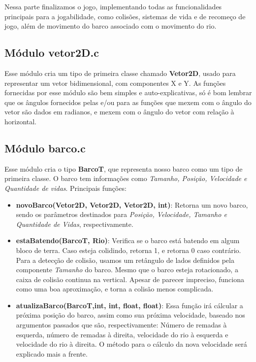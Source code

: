 \documentclass[11pt]{article}
\begin{document}
Nessa parte finalizamos o jogo, implementando todas as funcionalidades principais para a jogabilidade, como colisões, sistemas de vida e de recomeço de jogo, além de movimento do barco associado com o movimento do rio.

\subsection{Módulo vetor2D.c}

Esse módulo cria um tipo de primeira classe chamado \textbf{Vetor2D}, usado para representar um vetor bidimensional, com componentes X e Y. As funções fornecidas por esse módulo são bem simples e auto-explicativas, só é bom lembrar que os ângulos fornecidos pelas e/ou para as funções que mexem com o ângulo do vetor são dados em radianos, e mexem com o ângulo do vetor com relação à horizontal.


\subsection{Módulo barco.c}

Esse módulo cria o tipo \textbf{BarcoT}, que representa nosso barco como um tipo de primeira classe. O barco tem informações como \emph{Tamanho, Posição, Velocidade e Quantidade de vidas}. Principais funções:

\begin{itemize}

\item \textbf{novoBarco({\color{red}Vetor2D}, {\color{red}Vetor2D}, {\color{red}Vetor2D}, {\color{red}int})}: Retorna um novo barco, sendo os parâmetros destinados para \emph{Posição, Velocidade, Tamanho e Quantidade de Vidas}, respectivamente.

\item \textbf{estaBatendo({\color{red}BarcoT}, {\color{red}Rio})}: Verifica se o barco está batendo em algum bloco de terra. Caso esteja colidindo, retorna 1, e retorna 0 caso contrário. Para a detecção de colisão, usamos um retângulo de lados definidos pela componente \emph{Tamanho} do barco. Mesmo que o barco esteja rotacionado, a caixa de colisão continua na vertical. Apesar de parecer impreciso, funciona como uma boa aproximação, e torna a colisão menos complicada.

\item \textbf{atualizaBarco({\color{red}BarcoT},{\color{red}int}, {\color{red}int}, {\color{red}float}, {\color{red}float})}: Essa função irá cálcular a próxima posição do barco, assim como sua próxima velocidade, baseado nos argumentos passados que são, respectivamente: Número de remadas à esquerda, número de remadas à direita, velocidade do rio à esquerda e velocidade do rio à direita. O método para o cálculo da nova velocidade será explicado mais a frente.


\end{itemize}
\end{document}
